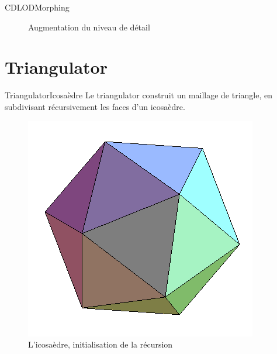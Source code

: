 \documentclass[french]{beamer}
\begin{document}
\begin{frame}{CDLOD}{Morphing}
\begin{figure}[H]
   
   \caption{Augmentation du niveau de détail}
\end{figure}


\end{frame}





\section{Triangulator}
\begin{frame}{Triangulator}{Icosaèdre}
  Le triangulator construit un maillage de triangle, en subdivisant récursivement les faces d'un icosaèdre.
\begin{figure}
   \includegraphics[scale=0.4]{img/Icosaedre.png}
   \caption{\label{étiquette} L'icosaèdre, initialisation de la récursion\protect\footnotemark}
\end{figure}
\end{frame}
\end{document}
